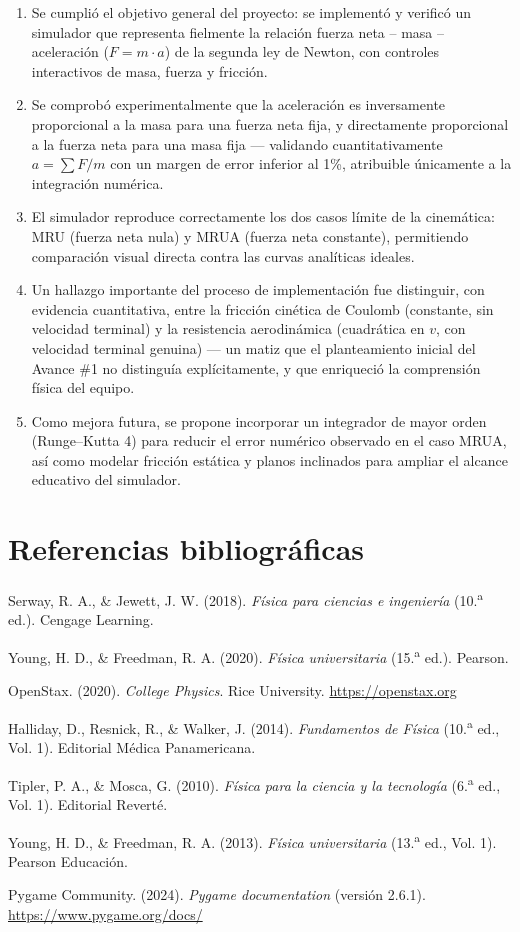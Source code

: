 \documentclass[12pt,letterpaper]{article}
\newcommand{\refitem}[1]{\par\noindent\hangindent=1cm\hangafter=1 #1\par\medskip}
\begin{document}
\begin{enumerate}[leftmargin=1.5em]
  \item Se cumplió el objetivo general del proyecto: se implementó y verificó un simulador que representa fielmente la relación fuerza neta -- masa -- aceleración ($F=m\cdot a$) de la segunda ley de Newton, con controles interactivos de masa, fuerza y fricción.
  \item Se comprobó experimentalmente que la aceleración es inversamente proporcional a la masa para una fuerza neta fija, y directamente proporcional a la fuerza neta para una masa fija --- validando cuantitativamente $a=\sum F/m$ con un margen de error inferior al 1\%, atribuible únicamente a la integración numérica.
  \item El simulador reproduce correctamente los dos casos límite de la cinemática: MRU (fuerza neta nula) y MRUA (fuerza neta constante), permitiendo comparación visual directa contra las curvas analíticas ideales.
  \item Un hallazgo importante del proceso de implementación fue distinguir, con evidencia cuantitativa, entre la fricción cinética de Coulomb (constante, sin velocidad terminal) y la resistencia aerodinámica (cuadrática en $v$, con velocidad terminal genuina) --- un matiz que el planteamiento inicial del Avance \#1 no distinguía explícitamente, y que enriqueció la comprensión física del equipo.
  \item Como mejora futura, se propone incorporar un integrador de mayor orden (Runge--Kutta 4) para reducir el error numérico observado en el caso MRUA, así como modelar fricción estática y planos inclinados para ampliar el alcance educativo del simulador.
\end{enumerate}

\section{Referencias bibliográficas}

\refitem{Serway, R. A., \& Jewett, J. W. (2018). \textit{Física para ciencias e ingeniería} (10.\textsuperscript{a} ed.). Cengage Learning.}

\refitem{Young, H. D., \& Freedman, R. A. (2020). \textit{Física universitaria} (15.\textsuperscript{a} ed.). Pearson.}

\refitem{OpenStax. (2020). \textit{College Physics}. Rice University. \url{https://openstax.org}}

\refitem{Halliday, D., Resnick, R., \& Walker, J. (2014). \textit{Fundamentos de Física} (10.\textsuperscript{a} ed., Vol. 1). Editorial Médica Panamericana.}

\refitem{Tipler, P. A., \& Mosca, G. (2010). \textit{Física para la ciencia y la tecnología} (6.\textsuperscript{a} ed., Vol. 1). Editorial Reverté.}

\refitem{Young, H. D., \& Freedman, R. A. (2013). \textit{Física universitaria} (13.\textsuperscript{a} ed., Vol. 1). Pearson Educación.}

\refitem{Pygame Community. (2024). \textit{Pygame documentation} (versión 2.6.1). \url{https://www.pygame.org/docs/}}
\end{document}
